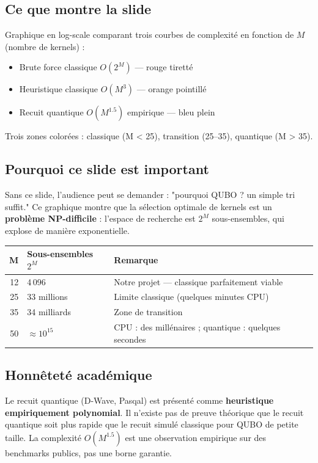\documentclass[12pt, a4paper]{article}
\begin{document}
\subsection*{Ce que montre la slide}

Graphique en log-scale comparant trois courbes de complexité en fonction de $M$ (nombre de kernels) :
\begin{itemize}
  \item Brute force classique $O(2^M)$ — rouge tiretté
  \item Heuristique classique $O(M^3)$ — orange pointillé
  \item Recuit quantique $O(M^{1.5})$ empirique — bleu plein
\end{itemize}
Trois zones colorées : classique (M < 25), transition (25–35), quantique (M > 35).

\subsection*{Pourquoi ce slide est important}

Sans ce slide, l'audience peut se demander : "pourquoi QUBO ? un simple tri suffit."
Ce graphique montre que la sélection optimale de kernels est un \textbf{problème NP-difficile} :
l'espace de recherche est $2^M$ sous-ensembles, qui explose de manière exponentielle.

\begin{center}
\begin{tabular}{rll}
  \toprule
  \textbf{M} & \textbf{Sous-ensembles $2^M$} & \textbf{Remarque} \\
  \midrule
  12  & 4\,096           & Notre projet — classique parfaitement viable \\
  25  & 33 millions      & Limite classique (quelques minutes CPU) \\
  35  & 34 milliards     & Zone de transition \\
  50  & $\approx 10^{15}$ & CPU : des millénaires ; quantique : quelques secondes \\
  \bottomrule
\end{tabular}
\end{center}

\subsection*{Honnêteté académique}

Le recuit quantique (D-Wave, Pasqal) est présenté comme \textbf{heuristique empiriquement polynomial}.
Il n'existe pas de preuve théorique que le recuit quantique soit plus rapide que le recuit simulé
classique pour QUBO de petite taille. La complexité $O(M^{1.5})$ est une observation empirique
sur des benchmarks publics, pas une borne garantie.
\end{document}
